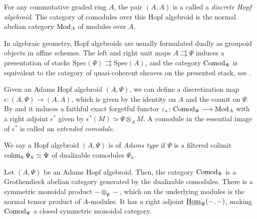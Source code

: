 \begin{example}
    \label{ex:modules-as-discrete-Hopf-algebroids}
    For any commutative graded ring $A$, the pair $(A, A)$ is a called a \emph{discrete Hopf algebroid}. The category of comodules over this Hopf algebroid is the normal abelian category $\mathrm{Mod}_A$ of modules over $A$. 
\end{example}

\begin{remark}
    \label{rm:presenting-stacks}
    In algebraic geometry, Hopf algebroids are usually formulated dually as groupoid objects in affine schemes. The left and right unit maps $A\rightrightarrows \Psi$ induces a presentation of stacks $\mathrm{Spec}(\Psi)\rightrightarrows \mathrm{Spec}(A)$, and the category $\mathrm{Comod}_\Psi$ is equivalent to the category of quasi-coherent sheaves on the presented stack, see \cite[Thm 8]{naumann_07}. 
\end{remark}

\begin{construction}
    Given an Adams Hopf algebroid $(A, \Psi)$, we can define a discretization map $\epsilon\colon (A, \Psi)\longrightarrow (A, A)$, which is given by the identity on $A$ and the counit on $\Psi$. By \cite[A1.2.1]{ravenel_86} and \cite[4.6]{barthel-heard-valenzuela_2018} it induces a faithful exact forgetful functor $\varepsilon_* \colon \mathrm{Comod}_\Psi \longrightarrow \mathrm{Mod}_A$ with a right adjoint $\epsilon^*$ given by $\epsilon^*(M)\simeq \Psi\otimes_A M$. A comodule in the essential image of $\epsilon^*$ is called an \emph{extended comodule}. 
\end{construction}

\begin{definition}
    \label{def:adams-hopf-algebroid}
    We say a Hopf algebroid $(A, \Psi)$ is of \emph{Adams type} if $\Psi$ is a filtered colimit $\operatorname{colim}_k \Psi_k \simeq \Psi$ of dualizable comodules $\Psi_k$.
\end{definition}

\begin{proposition}
    \label{prop:comod-is-sm-grothendieck}
    Let $(A,\Psi)$ be an Adams Hopf algebroid. Then, the category $\mathrm{Comod}_\Psi$ is a Grothendieck abelian category generated by the dualizable comodules. There is a symmetric monoidal product $-\otimes_\Psi -$, which on the underlying modules is the normal tensor product of $A$-modules. It has a right adjoint $\operatorname{\underline{Hom}}_\Psi(-,-)$, making $\mathrm{Comod}_\Psi$ a closed symmetric monoidal category. 
\end{proposition}

